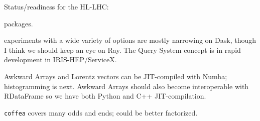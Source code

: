 \documentclass[aspectratio=169]{beamer}
\begin{document}
\begin{frame}{Status/readiness for the HL-LHC:}
\begin{description}[<+-|alert@+>]
packages.

\item[\textcolor{darkblue}{Distributed computing:}] experiments with a wide variety of options are mostly narrowing on Dask, though I think we should keep an eye on Ray. The Query System concept is in rapid development in IRIS-HEP/ServiceX.

\item[\textcolor{darkblue}{Acceleration:}] Awkward Arrays and Lorentz vectors can be JIT-compiled with Numba; histogramming is next. Awkward Arrays should also become interoperable with RDataFrame so we have both Python and C++ JIT-compilation.

\item[\textcolor{darkblue}{HEP domain-specific:}] \texttt{coffea} covers many odds and ends; could be better factorized.
\end{description}
\end{frame}
\end{document}

